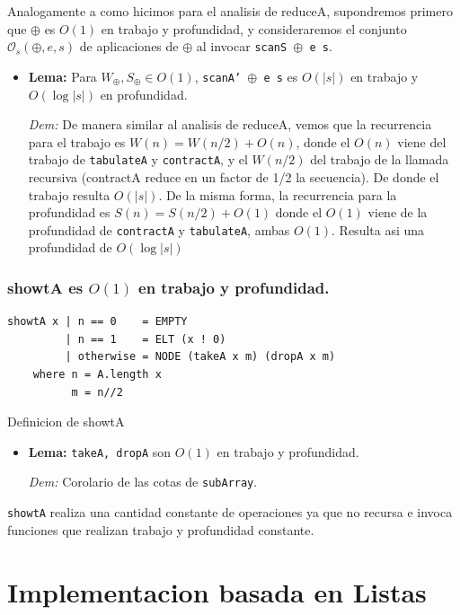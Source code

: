 \documentclass[12pt]{article}
\begin{document}
Analogamente a como hicimos para el analisis de reduceA, supondremos primero que $\oplus$ es $O(1)$ en trabajo y profundidad, y consideraremos el conjunto $\mathcal{O}_s(\oplus,e,s)$ de aplicaciones de $\oplus$ al invocar \texttt{scanS $\oplus$ e s}.

\begin{itemize}
\item \textbf{Lema:} Para $W_\oplus,S_\oplus \in O(1)$, \texttt{scanA' $\oplus$ e s} es $O(|s|)$ en trabajo y $O(\log |s|)$ en profundidad.

 \textit{Dem:} De manera similar al analisis de reduceA, vemos que la recurrencia para el trabajo es $W(n) = W(n/2) + O(n)$, donde el $O(n)$  viene del trabajo de \texttt{tabulateA} y \texttt{contractA}, y el $W(n/2)$ del trabajo de la llamada recursiva (contractA reduce en un factor de 1/2 la secuencia). De donde el trabajo resulta $O(|s|)$. De la misma forma, la recurrencia para la profundidad es $S(n) = S(n/2) + O(1)$ donde el $O(1)$ viene de la profundidad de \texttt{contractA} y \texttt{tabulateA}, ambas $O(1)$. Resulta asi una profundidad de $O(\log |s|)$
\end{itemize}



\subsubsection{showtA es $O(1)$ en trabajo y profundidad.}

\begin{table}[h]
\begin{lstlisting}
showtA x | n == 0    = EMPTY 
         | n == 1    = ELT (x ! 0)
         | otherwise = NODE (takeA x m) (dropA x m)
    where n = A.length x
          m = n//2
\end{lstlisting}
\caption{Definicion de showtA}
\end{table}

\begin{itemize}
\item \textbf{Lema:}  \texttt{takeA, dropA} son $O(1)$ en trabajo y profundidad.

 \textit{Dem:} Corolario de las cotas de \texttt{subArray}.

\end{itemize}

\texttt{showtA} realiza una cantidad constante de operaciones ya que no recursa e invoca funciones que realizan trabajo y profundidad constante.

\section{Implementacion basada en Listas}
\end{document}
